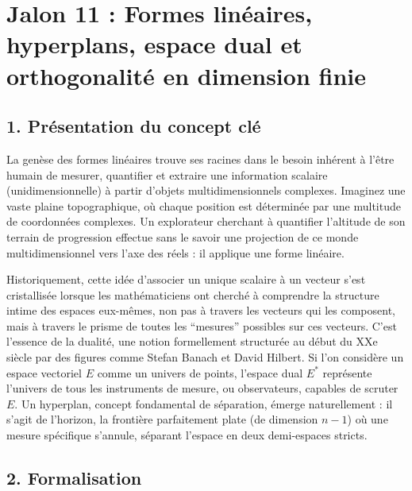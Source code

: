 \hypertarget{jalon-11-formes-linuxe9aires-hyperplans-espace-dual-et-orthogonalituxe9-en-dimension-finie}{%
\section{Jalon 11 : Formes linéaires, hyperplans, espace dual et
orthogonalité en dimension
finie}\label{jalon-11-formes-linuxe9aires-hyperplans-espace-dual-et-orthogonalituxe9-en-dimension-finie}}

\hypertarget{pruxe9sentation-du-concept-cluxe9}{%
\subsection{1. Présentation du concept
clé}\label{pruxe9sentation-du-concept-cluxe9}}

La genèse des formes linéaires trouve ses racines dans le besoin
inhérent à l'être humain de mesurer, quantifier et extraire une
information scalaire (unidimensionnelle) à partir d'objets
multidimensionnels complexes. Imaginez une vaste plaine topographique,
où chaque position est déterminée par une multitude de coordonnées
complexes. Un explorateur cherchant à quantifier l'altitude de son
terrain de progression effectue sans le savoir une projection de ce
monde multidimensionnel vers l'axe des réels : il applique une forme
linéaire.

Historiquement, cette idée d'associer un unique scalaire à un vecteur
s'est cristallisée lorsque les mathématiciens ont cherché à comprendre
la structure intime des espaces eux-mêmes, non pas à travers les
vecteurs qui les composent, mais à travers le prisme de toutes les
``mesures'' possibles sur ces vecteurs. C'est l'essence de la dualité,
une notion formellement structurée au début du XXe siècle par des
figures comme Stefan Banach et David Hilbert. Si l'on considère un
espace vectoriel \(E\) comme un univers de points, l'espace dual \(E^*\)
représente l'univers de tous les instruments de mesure, ou observateurs,
capables de scruter \(E\). Un hyperplan, concept fondamental de
séparation, émerge naturellement : il s'agit de l'horizon, la frontière
parfaitement plate (de dimension \(n-1\)) où une mesure spécifique
s'annule, séparant l'espace en deux demi-espaces stricts.

\hypertarget{formalisation}{%
\subsection{2. Formalisation}\label{formalisation}}

